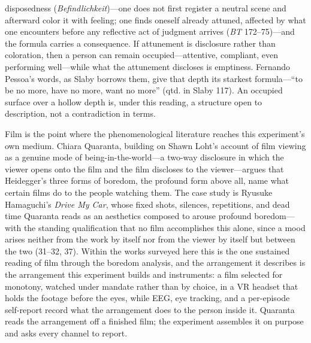 disposedness (\textit{Befindlichkeit})---one does not first register a neutral scene and
afterward color it with feeling; one finds oneself already attuned, affected by what one
encounters before any reflective act of judgment arrives (\textit{BT} 172--75)---and the
formula carries a consequence. If attunement is disclosure rather than coloration, then a
person can remain occupied---attentive, compliant, even performing well---while what the
attunement discloses is emptiness. Fernando Pessoa's words, as Slaby borrows them, give that
depth its starkest formula---``to be no more, have no more, want no more'' (qtd. in Slaby 117). An occupied surface over a hollow
depth is, under this reading, a structure open to description, not a contradiction in terms.

Film is the point where the phenomenological literature reaches this experiment's own medium.
Chiara Quaranta, building on Shawn Loht's account of film viewing as a genuine mode of
being-in-the-world---a two-way disclosure in which the viewer opens onto the film and the
film discloses to the viewer---argues that Heidegger's three forms of boredom, the profound
form above all, name what certain films do to the people watching them. The case study is
Ryusuke Hamaguchi's \textit{Drive My Car}, whose fixed shots, silences, repetitions, and dead
time Quaranta reads as an aesthetics composed to arouse profound boredom---with the standing
qualification that no film accomplishes this alone, since a mood arises neither from the work
by itself nor from the viewer by itself but between the two (31--32, 37). Within the works
surveyed here this is the one sustained reading of film through the boredom analysis, and the
arrangement it describes is the arrangement this experiment builds and instruments: a film
selected for monotony, watched under mandate rather than by choice, in a VR headset that
holds the footage before the eyes, while EEG, eye tracking, and a per-episode self-report
record what the arrangement does to the person inside it. Quaranta reads the arrangement off
a finished film; the experiment assembles it on purpose and asks every channel to report.

